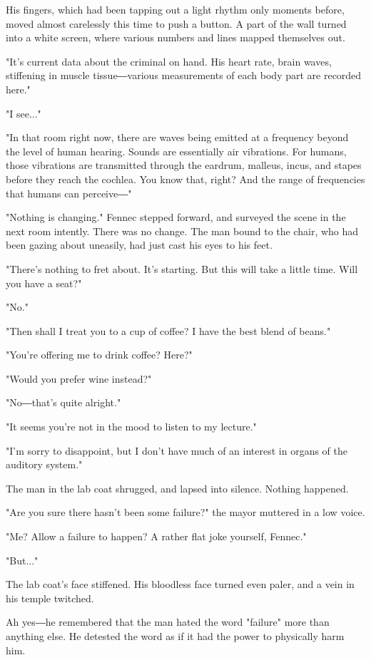 His fingers, which had been tapping out a light rhythm only moments
before, moved almost carelessly this time to push a button. A part of
the wall turned into a white screen, where various numbers and lines
mapped themselves out.

"It's current data about the criminal on hand. His heart rate, brain
waves, stiffening in muscle tissue―various measurements of each body
part are recorded here."

"I see..."

"In that room right now, there are waves being emitted at a frequency
beyond the level of human hearing. Sounds are essentially air
vibrations. For humans, those vibrations are transmitted through the
eardrum, malleus, incus, and stapes before they reach the cochlea. You
know that, right? And the range of frequencies that humans can
perceive―"

"Nothing is changing." Fennec stepped forward, and surveyed the scene in
the next room intently. There was no change. The man bound to the chair,
who had been gazing about uneasily, had just cast his eyes to his feet.

"There's nothing to fret about. It's starting. But this will take a
little time. Will you have a seat?"

"No."

"Then shall I treat you to a cup of coffee? I have the best blend of
beans."

"You're offering me to drink coffee? Here?"

"Would you prefer wine instead?"

"No―that's quite alright."

"It seems you're not in the mood to listen to my lecture."

"I'm sorry to disappoint, but I don't have much of an interest in organs
of the auditory system."

The man in the lab coat shrugged, and lapsed into silence. Nothing
happened.

"Are you sure there hasn't been some failure?" the mayor muttered in a
low voice.

"Me? Allow a failure to happen? A rather flat joke yourself, Fennec."

"But..."

The lab coat's face stiffened. His bloodless face turned even paler, and
a vein in his temple twitched.

Ah yes―he remembered that the man hated the word "failure" more than
anything else. He detested the word as if it had the power to physically
harm him.

